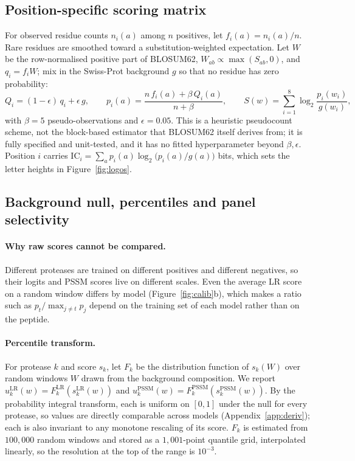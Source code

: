 \subsection{Position-specific scoring matrix}
For observed residue counts $n_{i}(a)$ among $n$ positives, let $f_i(a)=n_i(a)/n$. Rare residues are smoothed toward a substitution-weighted expectation. Let $W$ be the row-normalised positive part of BLOSUM62, $W_{ab}\propto\max(S_{ab},0)$, and $q_i=f_i W$; mix in the Swiss-Prot background $g$ so that no residue has zero probability:
\begin{equation}
Q_i=(1-\epsilon)\,q_i+\epsilon\,g,\qquad p_i(a)=\frac{n\,f_i(a)+\beta\,Q_i(a)}{n+\beta},\qquad S(w)=\sum_{i=1}^{8}\log_2\frac{p_i(w_i)}{g(w_i)},
\label{eq:pssm}
\end{equation}
with $\beta=5$ pseudo-observations and $\epsilon=0.05$. This is a heuristic pseudocount scheme, not the block-based estimator that BLOSUM62 itself derives from; it is fully specified and unit-tested, and it has no fitted hyperparameter beyond $\beta,\epsilon$. Position $i$ carries $\mathrm{IC}_i=\sum_a p_i(a)\log_2\!\bigl(p_i(a)/g(a)\bigr)$ bits, which sets the letter heights in Figure~\ref{fig:logos}.

\subsection{Background null, percentiles and panel selectivity}
\label{sec:null}
\paragraph{Why raw scores cannot be compared.} Different proteases are trained on different positives and different negatives, so their logits and PSSM scores live on different scales. Even the average LR score on a random window differs by model (Figure~\ref{fig:calib}b), which makes a ratio such as $p_t/\max_{j\ne t}p_j$ depend on the training set of each model rather than on the peptide.

\paragraph{Percentile transform.} For protease $k$ and score $s_k$, let $F_k$ be the distribution function of $s_k(W)$ over random windows $W$ drawn from the background composition. We report $u_k^{\mathrm{LR}}(w)=F_k^{\mathrm{LR}}(s_k^{\mathrm{LR}}(w))$ and $u_k^{\mathrm{PSSM}}(w)=F_k^{\mathrm{PSSM}}(s_k^{\mathrm{PSSM}}(w))$. By the probability integral transform, each is uniform on $[0,1]$ under the null for every protease, so values are directly comparable across models (Appendix~\ref{app:deriv}); each is also invariant to any monotone rescaling of its score. $F_k$ is estimated from $100{,}000$ random windows and stored as a $1{,}001$-point quantile grid, interpolated linearly, so the resolution at the top of the range is $10^{-3}$.

